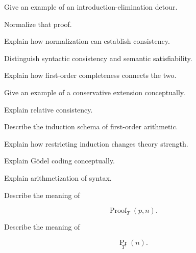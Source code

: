 \begin{exercise}[3]
Give an example of an introduction-elimination detour.
\end{exercise}

\begin{exercise}[3]
Normalize that proof.
\end{exercise}

\begin{exercise}[3]
Explain how normalization can establish consistency.
\end{exercise}

\begin{exercise}[2]
Distinguish syntactic consistency and semantic satisfiability.
\end{exercise}

\begin{exercise}[3]
Explain how first-order completeness connects the two.
\end{exercise}

\begin{exercise}[3]
Give an example of a conservative extension conceptually.
\end{exercise}

\begin{exercise}[3]
Explain relative consistency.
\end{exercise}

\begin{exercise}[3]
Describe the induction schema of first-order arithmetic.
\end{exercise}

\begin{exercise}[3]
Explain how restricting induction changes theory strength.
\end{exercise}

\begin{exercise}[2]
Explain Gödel coding conceptually.
\end{exercise}

\begin{exercise}[3]
Explain arithmetization of syntax.
\end{exercise}

\begin{exercise}[3]
Describe the meaning of

\[
\operatorname{Proof}_T(p,n).
\]
\end{exercise}

\begin{exercise}[3]
Describe the meaning of

\[
\operatorname{Pr}_T(n).
\]
\end{exercise}

